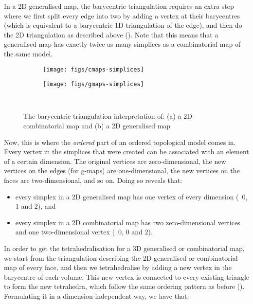 In a 2D generalised map, the barycentric triangulation requires an extra step where we first split every edge into two by adding a vertex at their barycentres (which is equivalent to a barycentric 1D triangulation of the edge), and then do the 2D triangulation as described above ().
Note that this means that a generalised map has exactly twice as many simplices as a combinatorial map of the same model.

\begin{figure}
\centering
\begin{subfigure}{0.3\linewidth}
\texttt{[image: figs/cmaps-simplices]}
\caption{}%
\label{subfig:cmaps-simplices}
\end{subfigure}
\quad
\begin{subfigure}{0.3\linewidth}
\texttt{[image: figs/gmaps-simplices]}
\caption{}%
\label{subfig:gmaps-simplices}
\end{subfigure}\\
\caption{The barycentric triangulation interpretation of: (a) a 2D combinatorial map and (b) a 2D generalised map}%
\label{fig:maps-simplices}
\end{figure}

Now, this is where the \emph{ordered} part of an ordered topological model comes in.
Every vertex in the simplices that were created can be associated with an element of a certain dimension.
The original vertices are zero-dimensional, the new vertices on the edges (for g-maps) are one-dimensional, the new vertices on the faces are two-dimensional, and so on.
Doing so reveals that:

\begin{itemize}
\item every simplex in a 2D generalised map has one vertex of every dimension (\ie\ \(0\), \(1\) and \(2\)), and
\item every simplex in a 2D combinatorial map has two zero-dimensional vertices and one two-di\-men\-sio\-nal vertex (\ie\ \(0\), \(0\) and \(2\)).
\end{itemize}

In order to get the tetrahedralisation for a 3D generalised or combinatorial map, we start from the triangulation describing the 2D generalised or combinatorial map of every face, and then we tetrahedralise by adding a new vertex in the barycentre of each volume.
This new vertex is connected to every existing triangle to form the new tetrahedra, which follow the same ordering pattern as before ().
Formulating it in a dimension-independent way, we have that:

